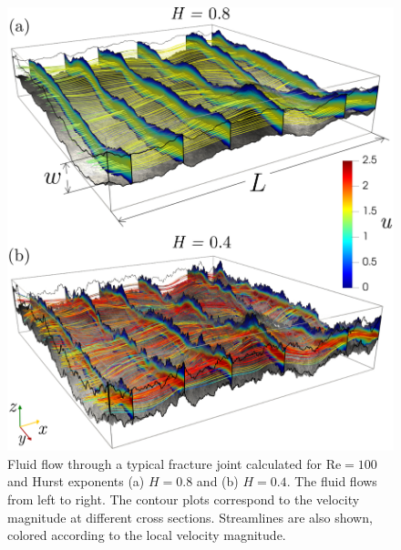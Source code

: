 \documentclass[aps,pre,
superscriptaddress,
twocolumn,
notitlepage,
10pt,]{revtex4-1}
\begin{document}
\begin{figure} [!ht]
	\centering
	\includegraphics[width=1.00\columnwidth]{fig1.png} %
	\caption{Fluid flow through a typical fracture joint calculated for
	$\mathrm{Re}=100$ and Hurst exponents (a) $H=0.8$ and (b) $H=0.4$. The fluid
	flows from left to right. The contour plots correspond to the velocity
	magnitude at different cross sections. Streamlines are also shown, colored
	according to the local velocity magnitude.} \label{fig1}
\end{figure}
\end{document}
